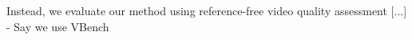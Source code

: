 \documentclass{article}
\begin{document}
Instead, we evaluate our method using reference-free video quality assessment [...]
- Say we use VBench




{
    \small
    
    
}
\end{document}
